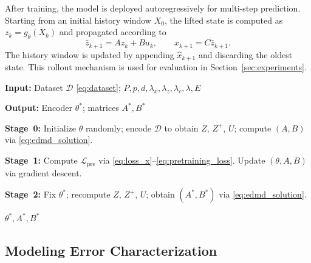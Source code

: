 \documentclass[journal]{IEEEtran}
\begin{document}
After training, the model is deployed autoregressively for multi-step prediction. Starting from an initial history window $X_0$, the lifted state is computed as $z_k = g_\theta(X_k)$ and propagated according to
\begin{equation}
    \hat{z}_{k+1} = A z_k + B u_k, \qquad
    \hat{x}_{k+1} = C \hat{z}_{k+1}.
\end{equation}
The history window is updated by appending $\hat{x}_{k+1}$ and discarding the oldest state. This rollout mechanism is used for evaluation in Section~\ref{sec:experiments}.

\begin{algorithm}[!t]
\caption{Transformer-Koopman Training Algorithm}
\label{alg:training}
\begin{algorithmic}[1]

\STATE \textbf{Input:} Dataset $\mathcal{D}$ \eqref{eq:dataset};
$P, p, d, \lambda_x, \lambda_z, \lambda_c, \lambda, E$

\STATE \textbf{Output:} Encoder $\theta^{*}$; matrices $A^{*}, B^{*}$

\STATE \textbf{Stage~0:}
Initialize $\theta$ randomly; encode $\mathcal{D}$ to obtain
$Z$, $Z^{+}$, $U$; compute $(A,B)$ via \eqref{eq:edmd_solution}.

\vspace{2pt}

\STATE \textbf{Stage~1:}
        \STATE Compute $\mathcal{L}_{\mathrm{pre}}$
               via \eqref{eq:loss_x}--\eqref{eq:pretraining_loss}.
        \STATE Update $(\theta, A, B)$ via gradient descent.
    \ENDFOR
\ENDFOR

\vspace{2pt}

\STATE \textbf{Stage~2:}
Fix $\theta^{*}$; recompute $Z$, $Z^{+}$, $U$;
obtain $(A^{*}, B^{*})$ via \eqref{eq:edmd_solution}.

\RETURN $\theta^{*}, A^{*}, B^{*}$

\end{algorithmic}
\end{algorithm}

\subsection{Modeling Error Characterization}
\label{subsec:modeling_error}
\end{document}
